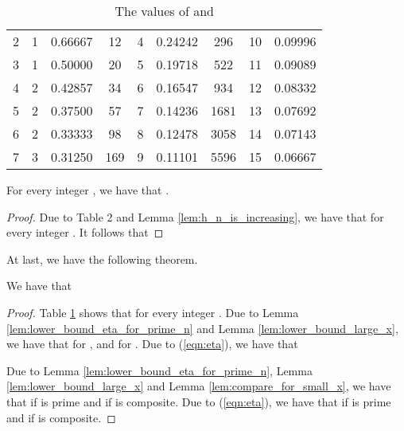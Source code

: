 \documentclass[JMC]{degruyter-journal}
\begin{document}
\begin{table}[t]
\begin{center}
    \begin{tabular}{|c|c|c||c|c|c||c|c|c|}\hline
   &  &  &   &  &  &   &  &  \\ \hline\hline
2 &   1    & 0.66667    &  12 &   4    & 0.24242  & 296 &  10    & 0.09996   \\ \hline
3 &   1    & 0.50000    &  20 &   5    & 0.19718  & 522 &  11 & 0.09089\\ \hline
4 &   2    & 0.42857    &  34 &   6    & 0.16547  & 934 &  12 & 0.08332\\ \hline
5 &   2    & 0.37500    &  57 &   7    & 0.14236  & 1681 &  13 & 0.07692\\ \hline
6 &   2    & 0.33333    &  98 &   8    & 0.12478  & 3058 &  14 & 0.07143\\ \hline
7 &   3    & 0.31250    &  169 &   9    & 0.11101 & 5596 &  15 & 0.06667\\ \hline
     \end{tabular}
    \end{center}
    \caption{The values of  and }
    \label{table:h_n}
\end{table}


\begin{lemma}\label{lem:compare_for_small_x}
For every integer ,
 we have that .
\end{lemma}
\begin{proof}
Due to Table 2 and Lemma \ref{lem:h_n_is_increasing}, we have that
 for every integer . It follows that

\end{proof}


At last, we have the following theorem.
\begin{theorem}\label{thm:lower_bound_eta_for_any_n}
We have that

\end{theorem}

\begin{proof}
Table \ref{table:h_n} shows that   for every integer .
Due to Lemma \ref{lem:lower_bound_eta_for_prime_n} and
Lemma \ref{lem:lower_bound_large_x},
we have that 
for ,  and  for .
Due to  (\ref{eqn:eta}), we have that


Due to Lemma \ref{lem:lower_bound_eta_for_prime_n}, Lemma \ref{lem:lower_bound_large_x}
and Lemma \ref{lem:compare_for_small_x},
we have that  if  is prime
and
 if  is composite.
 Due to  (\ref{eqn:eta}), we have that
  if  is prime and
   if  is composite.
\end{proof}
\end{document}
